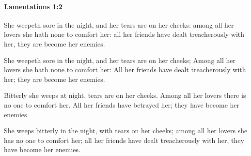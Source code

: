 		\paragraph{Lamentations 1:2} %
			\label{LAMENTATIONS-1-2}

			She weepeth sore in the night, and her tears are on her cheeks: among all her lovers she hath none to comfort her: all her friends have dealt treacherously with her, they are become her enemies.

			\begin{versebox}
					\item[BHS] 
					\item[LXX] 
					\item[ASV] She weepeth sore in the night, and her tears are on her cheeks; Among all her lovers she hath none to comfort her: All her friends have dealt treacherously with her; they are become her enemies.
					\item[NIV] Bitterly she weeps at night, tears are on her cheeks. Among all her lovers there is no one to comfort her. All her friends have betrayed her; they have become her enemies.
					\item[NRSV] She weeps bitterly in the night, with tears on her cheeks; among all her lovers she has no one to comfort her; all her friends have dealt treacherously with her, they have become her enemies.
			\end{versebox}

